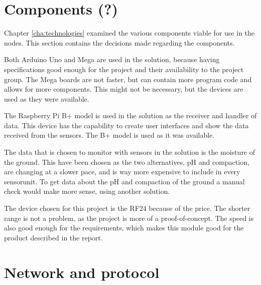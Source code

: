 \section{Components (?)}
Chapter \ref{cha:technologies} examined the various components viable for use in the nodes. This section contains the decisions made regarding the components.

Both Arduino Uno and Mega are used in the solution, because having specifications good enough for the project and their availability to the project group. The Mega boards are not faster, but can contain more program code and allows for more components. This might not be necessary, but the devices are used as they were available.

The Raspberry Pi B+ model is used in the solution as the receiver and handler of data. This device has the capability to create user interfaces and show the data received from the sensors. The B+ model is used as it was available.

The data that is chosen to monitor with sensors in the solution is the moisture of the ground. This have been chosen as the two alternatives, pH and compaction, are changing at a slower pace, and is way more expensive to include in every sensorunit. To get data about the pH and compaction of the ground a manual check would make more sense, using another solution. 

The device chosen for this project is the RF24 because of the price. The shorter range is not a problem, as the project is more of a proof-of-concept. The speed is also good enough for the requirements, which makes this module good for the product described in the report.



\section{Network and protocol}
